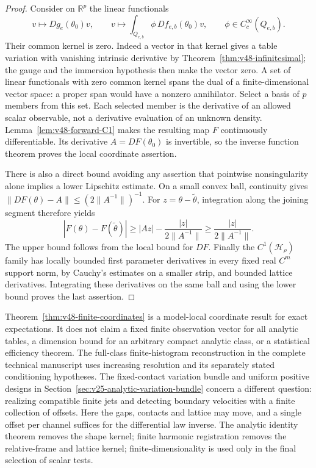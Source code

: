 \begin{proof}
Consider on $\mathbb R^p$ the linear functionals
\[
 v\longmapsto Dg_e(\theta_0)v,\qquad
 v\longmapsto\int_{Q_{e,b}}\phi\,Df_{e,b}(\theta_0)v,
                 \qquad \phi\in C_c^\infty(Q_{e,b}).
\]
Their common kernel is zero.  Indeed a vector in that kernel gives a
table variation with vanishing intrinsic derivative by
Theorem~\ref{thm:v48-infinitesimal}; the gauge and the immersion
hypothesis then make the vector zero.  A set of linear functionals
with zero common kernel spans the dual of a finite-dimensional vector
space: a proper span would have a nonzero annihilator.  Select a
basis of $p$ members from this set.  Each selected member is the
derivative of an allowed scalar observable, not a derivative evaluation
of an unknown density.  Lemma~\ref{lem:v48-forward-C1} makes the
resulting map $F$ continuously differentiable.  Its derivative
$A=DF(\theta_0)$ is invertible, so the inverse function theorem proves
the local coordinate assertion.

There is also a direct bound avoiding any assertion that pointwise
nonsingularity alone implies a lower Lipschitz estimate.  On a small
convex ball, continuity gives
$\|DF(\theta)-A\|\le(2\|A^{-1}\|)^{-1}$.  For
$z=\theta-\widetilde\theta$, integration along the joining segment
therefore yields
\[
 |F(\theta)-F(\widetilde\theta)|
 \ge |Az|-\frac{|z|}{2\|A^{-1}\|}
 \ge\frac{|z|}{2\|A^{-1}\|}.
\]
The upper bound follows from the local bound for $DF$.  Finally the
$C^1(\mathcal H_\rho)$ family has locally bounded first parameter
derivatives in every fixed real $C^m$ support norm, by Cauchy's
estimates on a smaller strip, and bounded lattice derivatives.
Integrating these derivatives on the same ball and using the lower
bound proves the last assertion.
\end{proof}

Theorem~\ref{thm:v48-finite-coordinates} is a model-local coordinate
result for exact expectations.  It does not claim a fixed finite
observation vector for all analytic tables, a dimension bound for an
arbitrary compact analytic class, or a statistical efficiency theorem.
The full-class finite-histogram reconstruction in the complete technical
manuscript uses increasing
resolution and its separately stated conditioning hypotheses.  The
fixed-contact variation bundle and uniform positive designs in
Section~\ref{sec:v25-analytic-variation-bundle} concern a different question:
realizing compatible finite jets and detecting boundary velocities with
a finite collection of offsets.  Here the gaps, contacts and lattice
may move, and a single offset per channel suffices for the differential
law inverse.  The analytic identity theorem removes the shape kernel;
finite harmonic registration removes the relative-frame and lattice
kernel; finite-dimensionality is used only in the final selection of
scalar tests.
